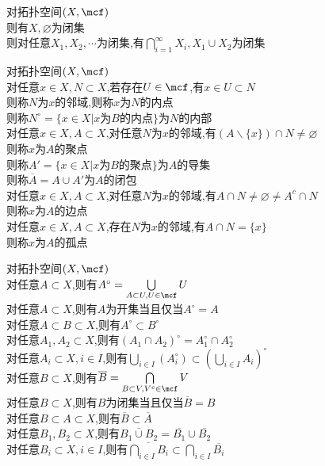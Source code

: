 \begin{dingli}
对拓扑空间$(X,\mcf)$\\
则有$X,\varnothing$为闭集\\
则对任意$X_1,X_2,\cdots$为闭集,有$\bigcap\limits_{i=1}^{\infty}X_i,X_1\cup X_2$为闭集
\end{dingli}

\begin{dingyi}
对拓扑空间$(X,\mcf)$\\
对任意$x\in X,N\subset X$,若存在$U\in \mcf$,有$x\in U\subset N$\\
则称$N$为$x$的邻域,则称$x$为$N$的内点\\
则称$N^{\circ}=\{x\in X|x\text{为}B\text{的内点}\}$为$N$的内部\\
对任意$x\in X,A\subset X$,对任意$N$为$x$的邻域,有$(A\backslash\{x\})\cap N\neq\varnothing$\\
则称$x$为$A$的聚点\\
则称$A'=\{x\in X|x\text{为}B\text{的聚点}\}$为$A$的导集\\
则称$\overline{A}=A\cup A'$为$A$的闭包\\
对任意$x\in X,A\subset X$,对任意$N$为$x$的邻域,有$A\cap N\neq\varnothing\neq A^{c}\cap N$\\
则称$x$为$A$的边点\\
对任意$x\in X,A\subset X$,存在$N$为$x$的邻域,有$A\cap N=\{x\}$\\
则称$x$为$A$的孤点
\end{dingyi}

\begin{dingli}
对拓扑空间$(X,\mcf)$\\
对任意$A\subset X$,则有$A^{\circ}=\bigcup\limits_{A\subset U,U\in \mcf}U$\\
对任意$A\subset X$,则有$A$为开集当且仅当$A^{\circ}=A$\\
对任意$A\subset B\subset X$,则有$A^{\circ}\subset B^{\circ}$\\
对任意$A_1,A_2\subset X$,则有$(A_1\cap A_2)^{\circ}=A_1^{\circ}\cap A_2^{\circ}$\\
对任意$A_i\subset X,i\in I$,则有$\bigcup\limits_{i\in I}(A_i^{\circ})\subset (\bigcup\limits_{i\in I}A_i)^{\circ}$\\
对任意$B\subset X$,则有$\overline{B}=\bigcap\limits_{B\subset V,V^{c}\in\mcf }V$\\
对任意$B\subset X$,则有$B$为闭集当且仅当$\overline{B}=B$\\
对任意$B\subset A\subset X$,则有$\overline{B}\subset \overline{A}$\\
对任意$B_1,B_2\subset X$,则有$\overline{B_1\cup B_2}=\overline{B_1}\cup\overline{B_2}$\\
对任意$B_i\subset X,i\in I$,则有$\overline{\bigcap\limits_{i\in I}B_i}\subset \bigcap\limits_{i\in I}\overline{B_i}$
\end{dingli}

